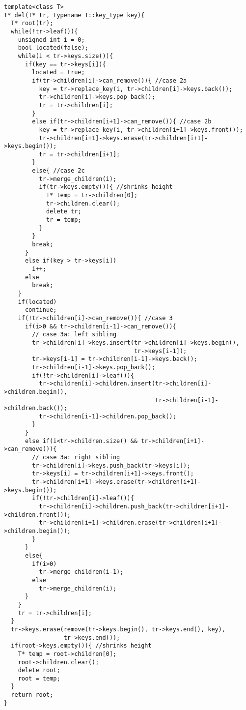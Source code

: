 \documentclass{article}
\begin{document}
\begin{lstlisting}
template<class T>
T* del(T* tr, typename T::key_type key){
  T* root(tr);
  while(!tr->leaf()){
    unsigned int i = 0;
    bool located(false);
    while(i < tr->keys.size()){
      if(key == tr->keys[i]){
        located = true;
        if(tr->children[i]->can_remove()){ //case 2a
          key = tr->replace_key(i, tr->children[i]->keys.back());
          tr->children[i]->keys.pop_back();
          tr = tr->children[i];
        }
        else if(tr->children[i+1]->can_remove()){ //case 2b
          key = tr->replace_key(i, tr->children[i+1]->keys.front());
          tr->children[i+1]->keys.erase(tr->children[i+1]->keys.begin());
          tr = tr->children[i+1];
        }
        else{ //case 2c
          tr->merge_children(i);
          if(tr->keys.empty()){ //shrinks height
            T* temp = tr->children[0];
            tr->children.clear();
            delete tr;
            tr = temp;
          }
        }
        break;
      }
      else if(key > tr->keys[i])
        i++;
      else
        break;
    }
    if(located)
      continue;
    if(!tr->children[i]->can_remove()){ //case 3
      if(i>0 && tr->children[i-1]->can_remove()){ 
        // case 3a: left sibling
        tr->children[i]->keys.insert(tr->children[i]->keys.begin(),
                                     tr->keys[i-1]);
        tr->keys[i-1] = tr->children[i-1]->keys.back();
        tr->children[i-1]->keys.pop_back();
        if(!tr->children[i]->leaf()){
          tr->children[i]->children.insert(tr->children[i]->children.begin(),
                                           tr->children[i-1]->children.back());
          tr->children[i-1]->children.pop_back();
        }
      }
      else if(i<tr->children.size() && tr->children[i+1]->can_remove()){
        // case 3a: right sibling
        tr->children[i]->keys.push_back(tr->keys[i]);
        tr->keys[i] = tr->children[i+1]->keys.front();
        tr->children[i+1]->keys.erase(tr->children[i+1]->keys.begin());
        if(!tr->children[i]->leaf()){
          tr->children[i]->children.push_back(tr->children[i+1]->children.front());
          tr->children[i+1]->children.erase(tr->children[i+1]->children.begin());
        }
      }
      else{
        if(i>0)
          tr->merge_children(i-1);
        else
          tr->merge_children(i);
      }
    }
    tr = tr->children[i];
  }
  tr->keys.erase(remove(tr->keys.begin(), tr->keys.end(), key), 
                 tr->keys.end());
  if(root->keys.empty()){ //shrinks height
    T* temp = root->children[0];
    root->children.clear();
    delete root;
    root = temp;
  }
  return root;
}
\end{lstlisting}
\end{document}
